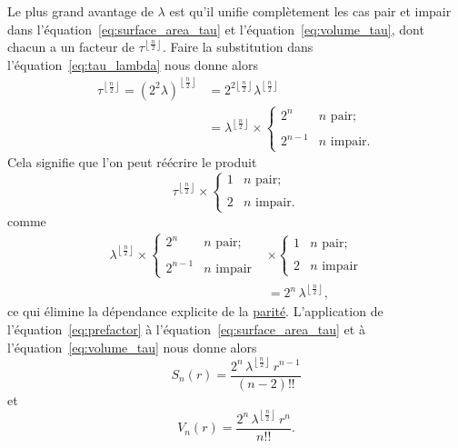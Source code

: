 Le plus grand avantage de $\lambda$ est qu'il unifie complètement les cas pair
et impair dans l'équation~\eqref{eq:surface_area_tau} et
l'équation~\eqref{eq:volume_tau}, dont chacun a un facteur de $\tau^{\left\lfloor
\frac{n}{2} \right\rfloor}$. Faire la substitution dans
l'équation~\eqref{eq:tau_lambda} nous donne alors
\[
\begin{split}
\tau^{\left\lfloor \frac{n}{2} \right\rfloor} = (2^2\lambda)^{\left\lfloor \frac{n}{2} \right\rfloor} & = 2^{2\left\lfloor \frac{n}{2} \right\rfloor} \lambda^{\left\lfloor \frac{n}{2} \right\rfloor} \\
& = \lambda^{\left\lfloor \frac{n}{2} \right\rfloor}\times
\begin{cases}
 2^n & n \text{ pair}; \\ \\
 2^{n-1} & n \text{ impair}.
 \end{cases}
 \end{split}
\]
Cela signifie que l'on peut réécrire le produit
\[
\tau^{\left\lfloor \frac{n}{2} \right\rfloor}\times \begin{cases}
1 & n \text{ pair}; \\ \\
2 & n \text{ impair}.
\end{cases}
\]
comme
\begin{equation}
\label{eq:prefactor}
\begin{split}
\lambda^{\left\lfloor \frac{n}{2} \right\rfloor} \times
\begin{cases}
 2^n & n \text{ pair}; \\ \\
 2^{n-1} & n \text{ impair}
 \end{cases}
 & \times
\begin{cases}
 1 & n \text{ pair}; \\ \\
 2 & n \text{ impair}
 \end{cases}
\\ & = 2^n\,\lambda^{\left\lfloor \frac{n}{2} \right\rfloor},
\end{split}
\end{equation}
ce qui élimine la dépendance explicite de la
\href{https://fr.wikipedia.org/wiki/Parité_(arithmétique)}{parité}.
L'application de \linebreak l'équation~\eqref{eq:prefactor} à
l'équation~\eqref{eq:surface_area_tau} et à l'équation~\eqref{eq:volume_tau}
nous donne alors
\begin{equation}
\label{eq:surface_area_lambda}
S_n(r) = \frac{2^n\,\lambda^{\left\lfloor \frac{n}{2} \right\rfloor}\,r^{n-1}}{(n-2)!!}
\end{equation}
et
\begin{equation}
\label{eq:volume_lambda}
V_n(r) = \frac{2^n\,\lambda^{\left\lfloor \frac{n}{2} \right\rfloor}\,r^n}{n!!}.
\end{equation}

